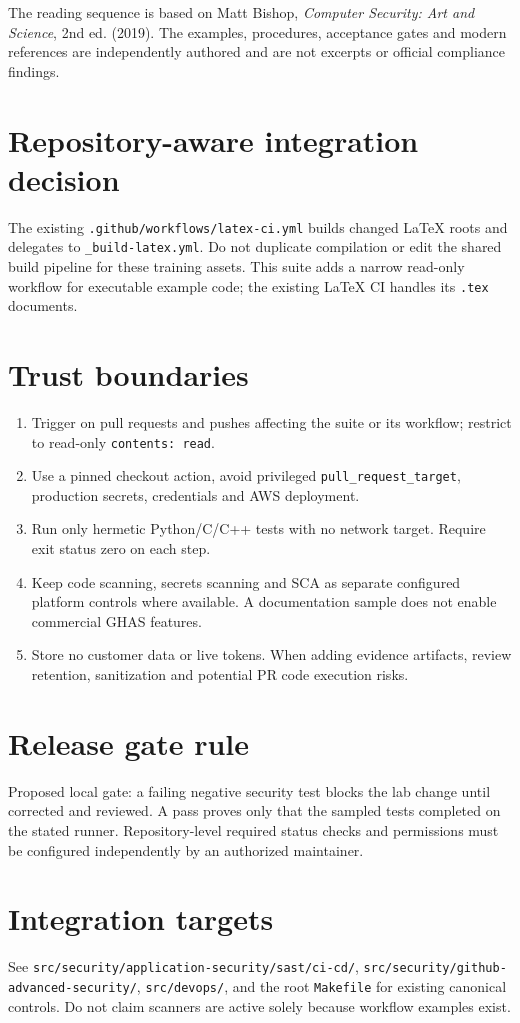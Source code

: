 \documentclass[10pt,letterpaper]{article}
\begin{document}
\makedoctocpage
\begin{notebox}
The reading sequence is based on Matt Bishop, \emph{Computer Security: Art and Science}, 2nd ed. (2019). The examples, procedures, acceptance gates and modern references are independently authored and are not excerpts or official compliance findings.
\end{notebox}
\section{Repository-aware integration decision}
The existing \nolinkurl{.github/workflows/latex-ci.yml} builds changed LaTeX roots and delegates to \nolinkurl{_build-latex.yml}. Do not duplicate compilation or edit the shared build pipeline for these training assets. This suite adds a narrow read-only workflow for executable example code; the existing LaTeX CI handles its \texttt{.tex} documents.
\section{Trust boundaries}
\begin{enumerate}
\item Trigger on pull requests and pushes affecting the suite or its workflow; restrict to read-only \texttt{contents: read}.
\item Use a pinned checkout action, avoid privileged \texttt{pull\_request\_target}, production secrets, credentials and AWS deployment.
\item Run only hermetic Python/C/C++ tests with no network target. Require exit status zero on each step.
\item Keep code scanning, secrets scanning and SCA as separate configured platform controls where available. A documentation sample does not enable commercial GHAS features.
\item Store no customer data or live tokens. When adding evidence artifacts, review retention, sanitization and potential PR code execution risks.
\end{enumerate}
\section{Release gate rule}
Proposed local gate: a failing negative security test blocks the lab change until corrected and reviewed. A pass proves only that the sampled tests completed on the stated runner. Repository-level required status checks and permissions must be configured independently by an authorized maintainer.
\section{Integration targets}
See \nolinkurl{src/security/application-security/sast/ci-cd/}, \nolinkurl{src/security/github-advanced-security/}, \nolinkurl{src/devops/}, and the root \texttt{Makefile} for existing canonical controls. Do not claim scanners are active solely because workflow examples exist.
\end{document}

